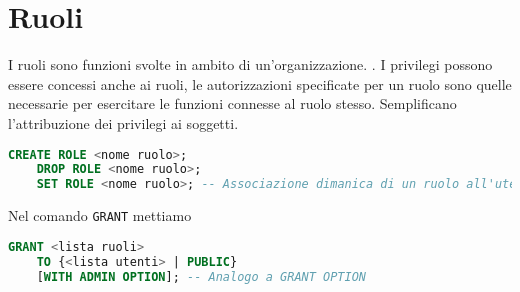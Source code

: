 \documentclass[12pt]{article}
\begin{document}
\section{Ruoli}
I ruoli sono funzioni svolte in ambito di un'organizzazione. . I privilegi possono essere concessi anche ai ruoli, le autorizzazioni specificate per un ruolo sono quelle necessarie per esercitare le funzioni connesse al ruolo stesso. Semplificano l'attribuzione dei privilegi ai soggetti.
\begin{lstlisting}[language=SQL]
    CREATE ROLE <nome ruolo>;
    DROP ROLE <nome ruolo>;
    SET ROLE <nome ruolo>; -- Associazione dimanica di un ruolo all'utente della sessione attiva
\end{lstlisting}
Nel comando \texttt{GRANT} mettiamo
\begin{lstlisting}[language=SQL]
    GRANT <lista ruoli>
    TO {<lista utenti> | PUBLIC}
    [WITH ADMIN OPTION]; -- Analogo a GRANT OPTION
\end{lstlisting}
\end{document}
